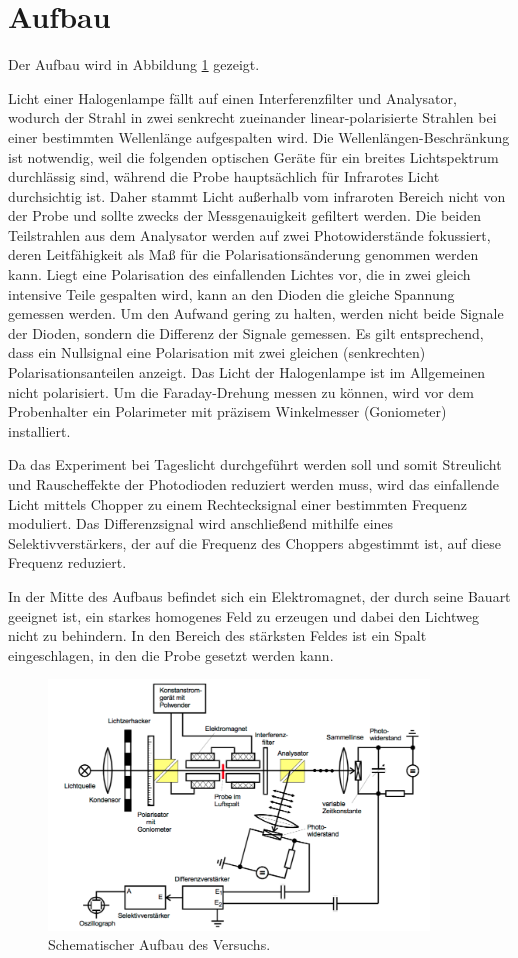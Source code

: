 \section{Aufbau}
\label{sec:Aufbau}
Der Aufbau wird in Abbildung \ref{setup} gezeigt.

Licht einer Halogenlampe fällt auf einen Interferenzfilter und Analysator,
wodurch der Strahl in zwei senkrecht zueinander linear-polarisierte Strahlen bei einer bestimmten Wellenlänge aufgespalten wird.
Die Wellenlängen-Beschränkung ist notwendig, weil die folgenden optischen Geräte für ein breites Lichtspektrum durchlässig sind,
während die Probe hauptsächlich für Infrarotes Licht durchsichtig ist.
Daher stammt Licht außerhalb vom infraroten Bereich nicht von der Probe und sollte zwecks der Messgenauigkeit gefiltert werden.
Die beiden Teilstrahlen aus dem Analysator werden auf zwei Photowiderstände fokussiert,
deren Leitfähigkeit als Maß für die Polarisationsänderung genommen werden kann.
Liegt eine Polarisation des einfallenden Lichtes vor, die in zwei gleich intensive Teile gespalten wird,
kann an den Dioden die gleiche Spannung gemessen werden.
Um den Aufwand gering zu halten, werden nicht beide Signale der Dioden, sondern die Differenz der Signale gemessen.
Es gilt entsprechend, dass ein Nullsignal eine Polarisation mit zwei gleichen (senkrechten) Polarisationsanteilen anzeigt.
Das Licht der Halogenlampe ist im Allgemeinen nicht polarisiert.
Um die Faraday-Drehung messen zu können, wird vor dem Probenhalter ein Polarimeter mit präzisem Winkelmesser (Goniometer) installiert.

Da das Experiment bei Tageslicht durchgeführt werden soll
und somit Streulicht und Rauscheffekte der Photodioden reduziert werden muss,
wird das einfallende Licht mittels Chopper zu einem Rechtecksignal einer bestimmten Frequenz moduliert.
Das Differenzsignal wird anschließend mithilfe eines Selektivverstärkers,
der auf die Frequenz des Choppers abgestimmt ist, auf diese Frequenz reduziert.

In der Mitte des Aufbaus befindet sich ein Elektromagnet, der durch seine Bauart geeignet ist,
ein starkes homogenes Feld zu erzeugen und dabei den Lichtweg nicht zu behindern.
In den Bereich des stärksten Feldes ist ein Spalt eingeschlagen, in den die Probe gesetzt werden kann.
\begin{figure}[h]
    \centering
    \includegraphics[width=0.9\textwidth]{graphics/setup.png}
    \caption{Schematischer Aufbau des Versuchs. \cite{skript}}
    \label{setup}
\end{figure}
\newpage
